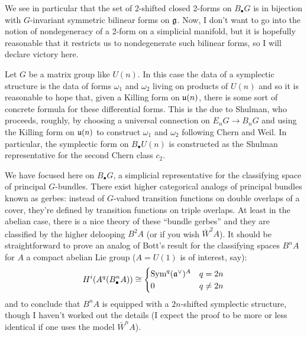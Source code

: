 \documentclass{amsart}
\begin{document}
We see in particular that the set of 2-shifted closed 2-forms
on $B_\bullet G$ is in bijection with 
$G$-invariant symmetric bilinear forms on $\mathfrak g$.
Now, I don't want to go into the notion of nondegeneracy of a 2-form on a 
simplicial manifold, but it is hopefully reasonable that it restricts us to 
nondegenerate such bilinear forms, so I will declare victory here.

\begin{remark}
    Let $G$ be a matrix group like $U(n)$.
    In this case the data of a symplectic structure is the data of forms 
    $\omega_1$ and $\omega_2$ living on products of $U(n)$ and so it is 
    reasonable to hope that, given a Killing form on $\mathfrak{u}(n)$, there is some 
    sort of concrete formula for these differential forms.
    This is the due to Shulman, who proceeds, roughly, by 
    choosing a universal connection on $E_nG\to B_nG$ and using the Killing form 
    on $\mathfrak{u}(n)$ to construct $\omega_1$ and $\omega_2$ following Chern and 
    Weil. In particular, the symplectic form on $B_\bullet U(n)$ is constructed 
    as the Shulman representative for the second Chern class $c_2$.
\end{remark}

\begin{remark}
    We have focused here on $B_\bullet G$, a simplicial representative for the 
    classifying space of principal $G$-bundles. There exist higher categorical 
    analogs of principal bundles known as gerbes: instead of $G$-valued 
    transition functions on double overlaps of a cover, they're defined by 
    transition functions on triple overlaps. At least in the abelian case, there 
    is a nice theory of these ``bundle gerbes'' and they are classified by the 
    higher delooping $B^2A$ (or if you wish $\bar W^2A$).
    It should be straightforward to prove an analog of Bott's result for the
    classifying spaces $B^nA$ for 
    $A$ a compact abelian Lie group ($A=U(1)$ is of interest, say):
    \begin{equation*}
        H^i(A^q(B^n_\bullet A)) \cong
        \begin{cases}
            \operatorname{Sym}^q(\mathfrak a^\vee)^A & q = 2n \\
            0 & q \neq 2n
        \end{cases}
    \end{equation*}
    and to conclude that $B^nA$ is equipped with a $2n$-shifted symplectic 
    structure, though I haven't worked out the details (I expect the proof to be 
    more or less identical if one uses the model $\bar W^nA$).
\end{remark}
\end{document}
